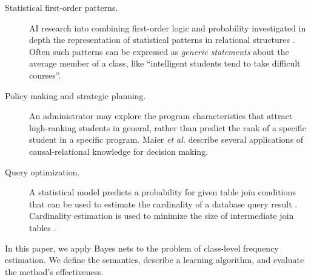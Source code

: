 \documentclass[oribibl]{llncs}
\begin{document}
\begin{description}
\item [Statistical first-order patterns.] AI research into combining first-order logic and probability investigated in depth the representation of statistical patterns in relational structures \cite{Halpern90,Bacchus90}. Often such patterns can be expressed as {\em generic statements} about the average member of a class, like ``intelligent students tend to take difficult courses''. 

\item [ Policy making and strategic planning.] An administrator may explore the program characteristics that attract high-ranking students in general, rather than predict the rank of a specific student in a specific program. Maier {\em et al.} \cite{Maier2010} describe several applications of causal-relational knowledge for decision making. 

\item [ Query optimization.] A statistical model predicts a probability for given table join conditions that can be used to estimate the cardinality of a database query result \cite{Getoor2001}. Cardinality estimation is used to minimize the size of intermediate join tables \cite{Babcock2005}. 
\end{description}

In this paper, we apply Bayes nets to the problem of class-level frequency estimation. We define the semantics, describe a learning algorithm, and evaluate the method's effectiveness.
\end{document}
